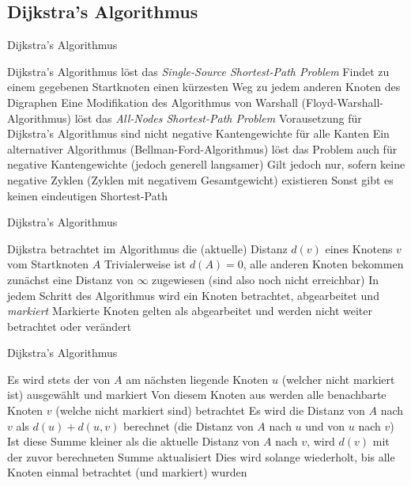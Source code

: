 \documentclass[mathserif]{beamer}
\begin{document}
\subsection{Dijkstra's Algorithmus}
\begin{frame}{Dijkstra's Algorithmus}
    \pause
    \begin{outline}
        \1 Dijkstra's Algorithmus löst das \textit{Single-Source Shortest-Path Problem}\pause
        \2 Findet zu einem gegebenen Startknoten einen kürzesten Weg zu jedem anderen Knoten des Digraphen\pause
        \2 Eine Modifikation des Algorithmus von Warshall (Floyd-Warshall-Algorithmus) löst das \textit{All-Nodes Shortest-Path Problem}\pause
        \1 Vorausetzung für Dijkstra's Algorithmus sind nicht negative Kantengewichte für alle Kanten\pause
        \2 Ein alternativer Algorithmus (Bellman-Ford-Algorithmus) löst das Problem auch für negative Kantengewichte (jedoch generell langsamer)\pause
        \2 Gilt jedoch nur, sofern keine negative Zyklen (Zyklen mit negativem Gesamtgewicht) existieren
        \3 Sonst gibt es keinen eindeutigen Shortest-Path
    \end{outline}
\end{frame}
\begin{frame}{Dijkstra's Algorithmus}
    \begin{outline}
        \1 Dijkstra betrachtet im Algorithmus die (aktuelle) Distanz $d(v)$ eines Knotens $v$ vom Startknoten $A$\pause
        \1 Trivialerweise ist $d(A)=0$, alle anderen Knoten bekommen zunächst eine Distanz von $\infty$ zugewiesen (sind also noch nicht erreichbar)\pause
        \1 In jedem Schritt des Algorithmus wird ein Knoten betrachtet, abgearbeitet und \textit{markiert}
        \2 Markierte Knoten gelten als abgearbeitet und werden nicht weiter betrachtet oder verändert
    \end{outline}
\end{frame}
\begin{frame}{Dijkstra's Algorithmus}
    \begin{outline}
        \1 Es wird stets der von $A$ am nächsten liegende Knoten $u$ (welcher nicht markiert ist) ausgewählt und markiert\pause
        \1 Von diesem Knoten aus werden alle benachbarte Knoten $v$ (welche nicht markiert sind) betrachtet\pause
        \2 Es wird die Distanz von $A$ nach $v$ als $d(u)+d(u,v)$ berechnet (die Distanz von $A$ nach $u$ und von $u$ nach $v$)
        \2 Ist diese Summe kleiner als die aktuelle Distanz von $A$ nach $v$, wird $d(v)$ mit der zuvor berechneten Summe aktualisiert\pause
        \1 Dies wird solange wiederholt, bis alle Knoten einmal betrachtet (und markiert) wurden
    \end{outline}
\end{frame}
\end{document}
